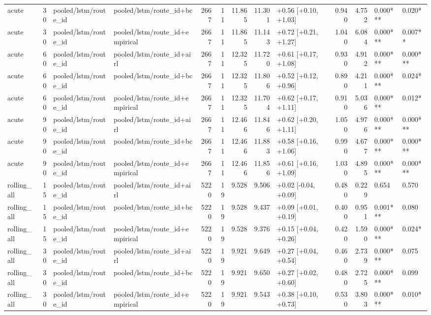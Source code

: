 \begin{tabular}{lrllrrrrlrrll}
acute & 30 & pooled/lstm/route_id & pooled/lstm/route_id+bc & 2667 & 11 & 11.865 & 11.301 & +0.56 [+0.10, +1.03] & 0.940 & 4.752 & 0.000*** & 0.020* \\
acute & 30 & pooled/lstm/route_id & pooled/lstm/route_id+empirical & 2667 & 11 & 11.865 & 11.143 & +0.72 [+0.21, +1.27] & 1.040 & 6.084 & 0.000*** & 0.007** \\
acute & 60 & pooled/lstm/route_id & pooled/lstm/route_id+airl & 2667 & 11 & 12.325 & 11.720 & +0.61 [+0.17, +1.08] & 0.930 & 4.912 & 0.000*** & 0.000*** \\
acute & 60 & pooled/lstm/route_id & pooled/lstm/route_id+bc & 2667 & 11 & 12.325 & 11.806 & +0.52 [+0.12, +0.96] & 0.890 & 4.211 & 0.000*** & 0.024* \\
acute & 60 & pooled/lstm/route_id & pooled/lstm/route_id+empirical & 2667 & 11 & 12.325 & 11.704 & +0.62 [+0.17, +1.11] & 0.910 & 5.036 & 0.000*** & 0.012* \\
acute & 90 & pooled/lstm/route_id & pooled/lstm/route_id+airl & 2667 & 11 & 12.466 & 11.846 & +0.62 [+0.20, +1.11] & 1.050 & 4.976 & 0.000*** & 0.000*** \\
acute & 90 & pooled/lstm/route_id & pooled/lstm/route_id+bc & 2667 & 11 & 12.466 & 11.883 & +0.58 [+0.16, +1.06] & 0.990 & 4.677 & 0.000*** & 0.000*** \\
acute & 90 & pooled/lstm/route_id & pooled/lstm/route_id+empirical & 2667 & 11 & 12.466 & 11.856 & +0.61 [+0.16, +1.09] & 1.030 & 4.895 & 0.000*** & 0.000*** \\
rolling_all & 15 & pooled/lstm/route_id & pooled/lstm/route_id+airl & 5220 & 19 & 9.528 & 9.506 & +0.02 [-0.04, +0.09] & 0.480 & 0.229 & 0.654 & 0.570 \\
rolling_all & 15 & pooled/lstm/route_id & pooled/lstm/route_id+bc & 5220 & 19 & 9.528 & 9.437 & +0.09 [+0.01, +0.19] & 0.400 & 0.951 & 0.001*** & 0.080 \\
rolling_all & 15 & pooled/lstm/route_id & pooled/lstm/route_id+empirical & 5220 & 19 & 9.528 & 9.376 & +0.15 [+0.04, +0.26] & 0.420 & 1.590 & 0.000*** & 0.024* \\
rolling_all & 30 & pooled/lstm/route_id & pooled/lstm/route_id+airl & 5220 & 19 & 9.921 & 9.649 & +0.27 [+0.04, +0.54] & 0.460 & 2.739 & 0.000*** & 0.075 \\
rolling_all & 30 & pooled/lstm/route_id & pooled/lstm/route_id+bc & 5220 & 19 & 9.921 & 9.650 & +0.27 [+0.02, +0.60] & 0.480 & 2.725 & 0.000*** & 0.099 \\
rolling_all & 30 & pooled/lstm/route_id & pooled/lstm/route_id+empirical & 5220 & 19 & 9.921 & 9.543 & +0.38 [+0.10, +0.73] & 0.530 & 3.803 & 0.000*** & 0.010* \\

\end{tabular}

